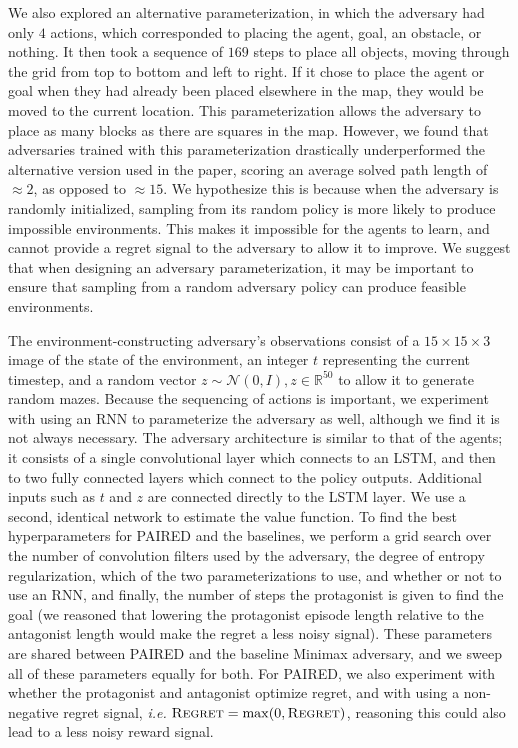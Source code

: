 \documentclass{article}
\begin{document}
\begin{appendix}
We also explored an alternative parameterization, in which the adversary had only $4$ actions, which corresponded to placing the agent, goal, an obstacle, or nothing. It then took a sequence of $169$ steps to place all objects, moving through the grid from top to bottom and left to right. If it chose to place the agent or goal when they had already been placed elsewhere in the map, they would be moved to the current location. This parameterization allows the adversary to place as many blocks as there are squares in the map. However, we found that adversaries trained with this parameterization drastically underperformed the alternative version used in the paper, scoring an average solved path length of $\approx2$, as opposed to $\approx15$. We hypothesize this is because when the adversary is randomly initialized, sampling from its random policy is more likely to produce impossible environments. This makes it impossible for the agents to learn, and cannot provide a regret signal to the adversary to allow it to improve. We suggest that when designing an adversary parameterization, it may be important to ensure that sampling from a random adversary policy can produce feasible environments. 

The environment-constructing adversary's observations consist of a $15\times15\times3$ image of the state of the environment, an integer $t$ representing the current timestep, and a random vector $z \sim \mathcal{N}(0,I), z \in \mathbb{R}^{50}$ to allow it to generate random mazes. Because the sequencing of actions is important, we experiment with using an RNN to parameterize the adversary as well, although we find it is not always necessary. The adversary architecture is similar to that of the agents; it consists of a single convolutional layer which connects to an LSTM, and then to two fully connected layers which connect to the policy outputs. Additional inputs such as $t$ and $z$ are connected directly to the LSTM layer. We use a second, identical network to estimate the value function. 
To find the best hyperparameters for PAIRED and the baselines, we perform a grid search over the number of convolution filters used by the adversary, the degree of entropy regularization, which of the two parameterizations to use, and whether or not to use an RNN, and finally, the number of steps the protagonist is given to find the goal (we reasoned that lowering the protagonist episode length relative to the antagonist length would make the regret a less noisy signal). These parameters are shared between PAIRED and the baseline Minimax adversary, and we sweep all of these parameters equally for both. For PAIRED, we also experiment with whether the protagonist and antagonist optimize regret, and with using a non-negative regret signal, \textit{i.e.} $\normalfont\textsc{Regret} = \max(0, \normalfont\textsc{Regret})$, reasoning this could also lead to a less noisy reward signal.


\end{appendix}
\end{document}
